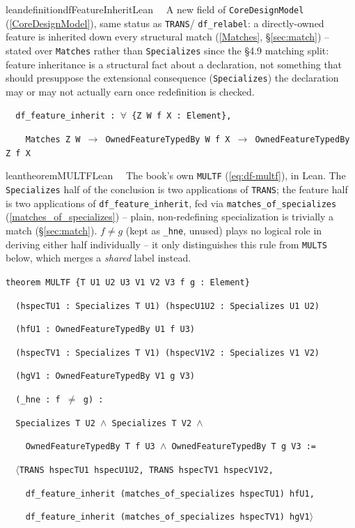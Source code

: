 \begin{restatable}{leandefinition}{dfFeatureInheritLean}~~ A new
field of \texttt{CoreDesignModel} (\ref{CoreDesignModel}), same status as \texttt{TRANS}/
\texttt{df\_relabel}: a directly-owned feature is inherited down every structural match
(\ref{Matches}, \S\ref{sec:match}) -- stated over \texttt{Matches} rather than \texttt{Specializes}
since the §4.9 matching split: feature inheritance is a structural fact about a declaration, not
something that should presuppose the extensional consequence (\texttt{Specializes}) the declaration
may or may not actually earn once redefinition is checked.

\texttt{~~df\_feature\_inherit : $\forall$ \{Z W f X : Element\},}

\texttt{~~~~Matches Z W $\to$ OwnedFeatureTypedBy W f X $\to$ OwnedFeatureTypedBy Z f X}
\label{df_feature_inherit}
\end{restatable}

\begin{restatable}{leantheorem}{MULTFLean}~~ The book's own \texttt{MULTF}
(\ref{eq:df-multf}), in Lean. The \texttt{Specializes} half of the conclusion is two applications of
\texttt{TRANS}; the feature half is two applications of \texttt{df\_feature\_inherit}, fed via
\texttt{matches\_of\_specializes} (\ref{matches_of_specializes}) -- plain, non-redefining
specialization is trivially a match (\S\ref{sec:match}). $f \ne g$
(kept as \texttt{\_hne}, unused) plays no logical role in deriving either half individually -- it
only distinguishes this rule from \texttt{MULTS} below, which merges a \emph{shared} label instead.

\texttt{\textcolor{leancolor}{theorem} \textcolor{leanyellow}{MULTF} \{T U1 U2 U3 V1 V2 V3 f g : Element\}}

\texttt{~~(hspecTU1 : Specializes T U1) (hspecU1U2 : Specializes U1 U2)}

\texttt{~~(hfU1 : OwnedFeatureTypedBy U1 f U3)}

\texttt{~~(hspecTV1 : Specializes T V1) (hspecV1V2 : Specializes V1 V2)}

\texttt{~~(hgV1 : OwnedFeatureTypedBy V1 g V3)}

\texttt{~~(\_hne : f $\ne$ g) :}

\texttt{~~Specializes T U2 $\wedge$ Specializes T V2 $\wedge$}

\texttt{~~~~OwnedFeatureTypedBy T f U3 $\wedge$ OwnedFeatureTypedBy T g V3 :=}

\texttt{~~$\langle$TRANS hspecTU1 hspecU1U2, TRANS hspecTV1 hspecV1V2,}

\texttt{~~~~df\_feature\_inherit (matches\_of\_specializes hspecTU1) hfU1,}

\texttt{~~~~df\_feature\_inherit (matches\_of\_specializes hspecTV1) hgV1$\rangle$}
\label{MULTF}
\end{restatable}

